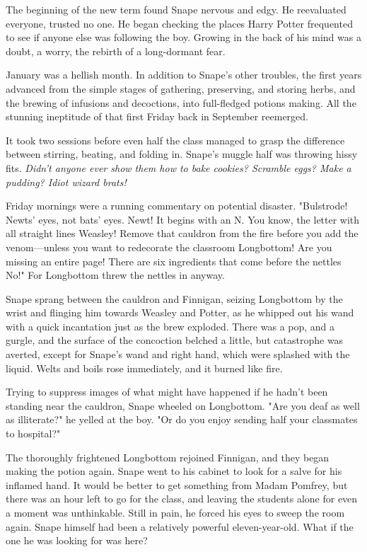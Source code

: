 The beginning of the new term found Snape nervous and edgy. He reevaluated everyone, trusted no one. He began checking the places Harry Potter frequented to see if anyone else was following the boy. Growing in the back of his mind was a doubt, a worry, the rebirth of a long-dormant fear.

January was a hellish month. In addition to Snape's other troubles, the first years advanced from the simple stages of gathering, preserving, and storing herbs, and the brewing of infusions and decoctions, into full-fledged potions making. All the stunning ineptitude of that first Friday back in September reemerged.

It took two sessions before even half the class managed to grasp the difference between stirring, beating, and folding in. Snape's muggle half was throwing hissy fits. \emph{Didn't anyone ever show them how to bake cookies? Scramble eggs? Make a pudding? Idiot wizard brats!}

Friday mornings were a running commentary on potential disaster. "Bulstrode! Newts' eyes, not bats' eyes. Newt! It begins with an N. You know, the letter with all straight lines{\el} Weasley! Remove that cauldron from the fire before you add the venom—unless you want to redecorate the classroom{\el} Longbottom! Are you missing an entire page! There are six ingredients that come before the nettles{\el} No!" For Longbottom threw the nettles in anyway.

Snape sprang between the cauldron and Finnigan, seizing Longbottom by the wrist and flinging him towards Weasley and Potter, as he whipped out his wand with a quick incantation just as the brew exploded. There was a pop, and a gurgle, and the surface of the concoction belched a little, but catastrophe was averted, except for Snape's wand and right hand, which were splashed with the liquid. Welts and boils rose immediately, and it burned like fire.

Trying to suppress images of what might have happened if he hadn't been standing near the cauldron, Snape wheeled on Longbottom. "Are you deaf as well as illiterate?" he yelled at the boy. "Or do you enjoy sending half your classmates to hospital?"

The thoroughly frightened Longbottom rejoined Finnigan, and they began making the potion again. Snape went to his cabinet to look for a salve for his inflamed hand. It would be better to get something from Madam Pomfrey, but there was an hour left to go for the class, and leaving the students alone for even a moment was unthinkable. Still in pain, he forced his eyes to sweep the room again. Snape himself had been a relatively powerful eleven-year-old. What if the one he was looking for was here?

